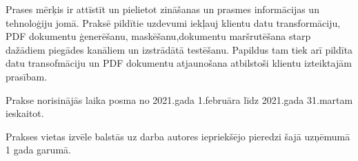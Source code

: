 Prases mērķis ir attīstīt un pielietot zināšanas un prasmes informācijas un tehnoloģiju jomā.
Praksē pildītie uzdevumi iekļauj klientu datu transformāciju, PDF dokumentu ģenerēšanu, maskēšanu,dokumentu maršrutēšana starp dažādiem piegādes kanāliem un izstrādātā testēšanu. Papildus tam tiek arī pildīta datu transofmāciju un PDF dokumentu atjaunošana atbilstoši klientu izteiktajām prasībam.
\par Prakse norisinājās laika posma no 2021.gada 1.februāra līdz 2021.gada 31.martam ieskaitot.
\par Prakses vietas izvēle balstās uz darba autores iepriekšējo pieredzi šajā uzņēmumā 1 gada garumā.